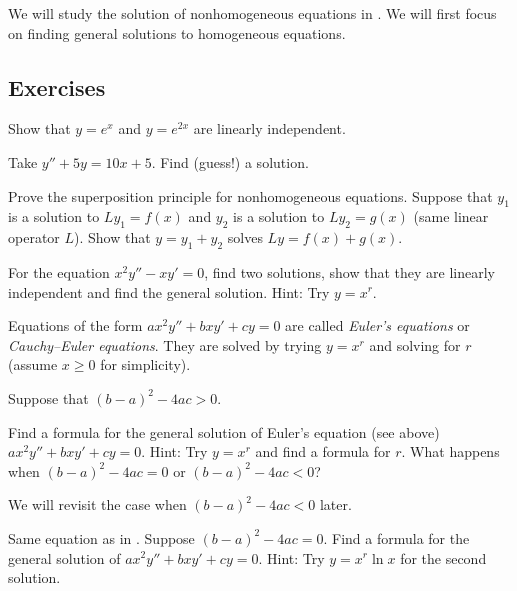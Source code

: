 \medskip

We will study the solution of nonhomogeneous equations in
.  We will first focus on finding general solutions to
homogeneous equations.


\subsection{Exercises}

\begin{exercise}
Show that $y=e^x$ and $y=e^{2x}$ are linearly independent.
\end{exercise}

\begin{exercise}
Take $y'' + 5 y = 10 x + 5$.  Find (guess!) a solution.
\end{exercise}

\begin{exercise}
Prove the superposition principle for nonhomogeneous equations.  Suppose that
$y_1$ is a solution to $L y_1 = f(x)$ and $y_2$ is a solution to
$L y_2 = g(x)$ (same linear operator $L$).  Show that $y = y_1+y_2$ solves
$Ly = f(x) + g(x)$.
\end{exercise}

\begin{exercise}
For the equation $x^2 y'' - x y' = 0$, find two solutions, show that they
are linearly independent and find the general solution.
Hint: Try $y = x^r$.
\end{exercise}

\pagebreak[2]
Equations of the form $a x^2 y'' + b x y' + c y = 0$ are called
\emph{Euler's equations} or
\emph{Cauchy--Euler equations}.
They are solved by trying
$y=x^r$ and solving for $r$ (assume $x \geq 0$ for simplicity).

\begin{exercise} \label{sol:eulerex}
\pagebreak[2]
Suppose that ${(b-a)}^2-4ac > 0$.
\begin{tasks}
\task Find a formula for the general solution
of Euler's equation (see above) $a x^2 y'' + b x y' + c y = 0$.
Hint: Try $y=x^r$ and find a formula for $r$.
\task What happens when ${(b-a)}^2-4ac = 0$ or ${(b-a)}^2-4ac < 0$?
\end{tasks}
\end{exercise}

We will revisit the case when ${(b-a)}^2-4ac < 0$ later.

\begin{exercise} \label{sol:eulerexln}
Same equation as in .
Suppose ${(b-a)}^2-4ac = 0$.  Find a formula for the general solution
of $a x^2 y'' + b x y' + c y = 0$.  Hint: Try $y=x^r \ln x$ for the second
solution.
\end{exercise}


